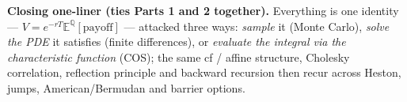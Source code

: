 \documentclass[11pt]{article}
\newcommand{\E}{\mathbb{E}}
\newcommand{\Q}{\mathbb{Q}}
\begin{document}
\vspace{4pt}
\noindent\textbf{Closing one-liner (ties Parts 1 and 2 together).} Everything is one identity ---
$V=e^{-rT}\E^{\Q}[\text{payoff}]$ --- attacked three ways: \emph{sample} it (Monte Carlo), \emph{solve the PDE}
it satisfies (finite differences), or \emph{evaluate the integral via the characteristic function} (COS); the
same cf / affine structure, Cholesky correlation, reflection principle and backward recursion then recur across
Heston, jumps, American/Bermudan and barrier options.
\end{document}
